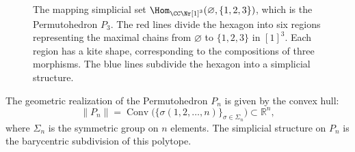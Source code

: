 \begin{figure}
    \centering
    \caption{The mapping simplicial set $\Hom_{\CC \Nr [1]^3}(\varnothing, \{1,2,3\})$, which is the Permutohedron $P_3$. The red lines divide the hexagon into six regions representing the maximal chains from $\varnothing$ to $\{1,2,3\}$ in $[1]^3$. Each region has a kite shape, corresponding to the compositions of three morphisms. The blue lines subdivide the hexagon into a simplicial structure.}\label{fig:P_3}
\end{figure}

\begin{lem}
The geometric realization of the Permutohedron $P_n$ is given by the convex hull:
\begin{equation*}
    \lVert P_n \rVert = \operatorname{Conv}\bigl( \{ \sigma(1, 2, \dots, n) \}_{\sigma \in \Sigma_n} \bigr) \subset \mathbb{R}^n,
\end{equation*}
where $\Sigma_n$ is the symmetric group on $n$ elements. The simplicial structure on $P_n$ is the barycentric subdivision of this polytope.
\end{lem}


